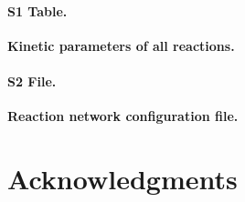 \documentclass[10pt,letterpaper]{article}
\begin{document}




\paragraph*{S1 Table.}
\label{S1_Table}
{\bf Kinetic parameters of all reactions.}
\paragraph*{S2 File.}
\label{S2_File}
{\bf Reaction network configuration file.}

\section*{Acknowledgments}

\nolinenumbers

%
%
% 
{}
\end{document}
